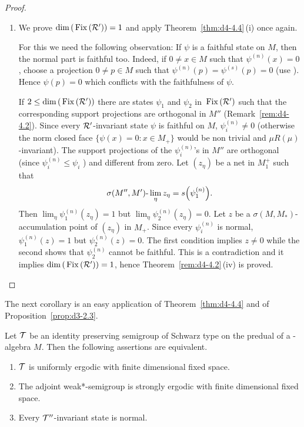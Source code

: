\begin{proof}
\begin{enumerate}[\upshape (i), wide, labelindent=.25em]
\item
We prove $ \mathop{}\!\mathrm{dim}\,(\mathop{}\mathrm{Fix}\left(\mathcal{R}'\right)) = 1 $  and apply Theorem~\ref{thm:d4-4.4}\,(i) once again.

For this we need the following observation: If\/ $ \psi $  is a faithful state on $ M $,  then the normal part is faithful too.
Indeed, if\/ $ 0 \neq x \in M $  such that $ \psi^{(n)}(x) = 0 $,  choose a projection $ 0 \neq p \in M $  such that $ \psi^{(n)}(p) = \psi^{(s)}(p) = 0 $ (use \textcite[Theorem III.3.8]{takesaki:1979}). 
Hence $ \psi(p) = 0 $  which conflicts with the faithfulness of\/ $ \psi $.

If\/ $ 2 \leq \dim (\Fix{\RR'}) $  there are states $ \psi_{1} $  and $ \psi_{2} $  in $ \mathop{}\mathrm{Fix}\left(\mathcal{R}'\right) $  such that the corresponding support projections are orthogonal in $ M'' $  (Remark~\ref{rem:d4-4.2}).
Since every $ \mathcal{R}' $-invariant state $ \psi $  is faithful on $ M $, $ \psi_{i}^{(n)} \neq 0 $  (otherwise the norm closed face $ \{\psi(x) = 0: x \in M_{+}\} $  would
be non trivial and $ \mu R(\mu) $-invariant).
The support projections of the $ \psi_{i}^{(n)} $'s in $ M'' $  are orthogonal (since $ \psi_{i}^{(n)} \leq \psi_{i} $ ) and different from zero.
Let $ (z_{\eta}) $  be a net in $ M_{1}^{+} $  such that
\[
	\sigma(M'',M')\text{-}\lim_{\eta} z_{\eta} = s\mleft(\psi_{1}^{(n)}\mright).
\]
Then $ \lim_{\eta} \psi_{1}^{(n)}(z_{\eta}) = 1 $  but $ \lim_{\eta} \psi_{2}^{(n)}(z_{\eta}) = 0 $.
Let $ z $  be a $ \sigma(M,M_{*}) $-accumulation point of\/ $ (z_{\eta}) $  in $ M_{+} $.
Since every $ \psi_{i}^{(n)} $  is normal, $ \psi_{1}^{(n)}(z) = 1 $  but $ \psi_{2}^{(n)}(z) = 0 $.
The first condition implies $ z \neq 0 $  while the second shows that $ \psi_{2}^{(n)} $  cannot be faithful.
This is a contradiction and it implies $ \mathop{}\!\mathrm{dim}\,( \mathop{}\mathrm{Fix}\left(\mathcal{R}'\right)) = 1 $, hence Theorem~\ref{rem:d4-4.2}\,(iv) is proved.
\end{enumerate}
\end{proof}
The next corollary is an easy application of\/ Theorem~\ref{thm:d4-4.4} and of Proposition~\ref{prop:d3-2.3}.
\begin{corollary}\label{cor:d4-4.5}
Let $ \mathcal{T} $  be an identity preserving semigroup of Schwarz type on the predual of a \WA-algebra $ M $.
Then the following assertions are equivalent.
\begin{enumerate}[\upshape (a)]
\item
$ \mathcal{T} $  is uniformly ergodic with finite dimensional fixed space.

\item
The adjoint weak*-semigroup is strongly ergodic with finite dimensional fixed space.

\item
Every $ \mathcal{T}'' $-invariant state is normal.
\end{enumerate}
\end{corollary}
